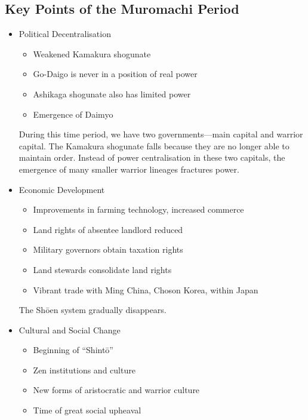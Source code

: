 \documentclass[class=article, crop=false]{standalone}
\begin{document}
  \subsection{Key Points of the Muromachi Period}
  \begin{itemize}
    \item Political Decentralisation
    \begin{itemize}
      \item Weakened Kamakura shogunate
      \item Go-Daigo is never in a position of real power
      \item Ashikaga shogunate also has limited power
      \item Emergence of Daimyo
    \end{itemize}
    \begin{note}{}
      During this time period, we have two governments---main capital and warrior capital. The Kamakura shogunate falls because they are no longer able to maintain order. Instead of power centralisation in these two capitals, the emergence of many smaller warrior lineages fractures power.
    \end{note}
    \item Economic Development
    \begin{itemize}
      \item Improvements in farming technology, increased commerce
      \item Land rights of absentee landlord reduced
      \item Military governors obtain taxation rights
      \item Land stewards consolidate land rights
      \item Vibrant trade with Ming China, Choson Korea, within Japan
    \end{itemize}
    \begin{note}{}
      The Sh\=oen system gradually disappears.
    \end{note}
    \item Cultural and Social Change
    \begin{itemize}
      \item Beginning of ``Shint\=o''
      \item Zen institutions and culture
      \item New forms of aristocratic and warrior culture
      \item Time of great social upheaval
    \end{itemize}
  \end{itemize}
\end{document}
